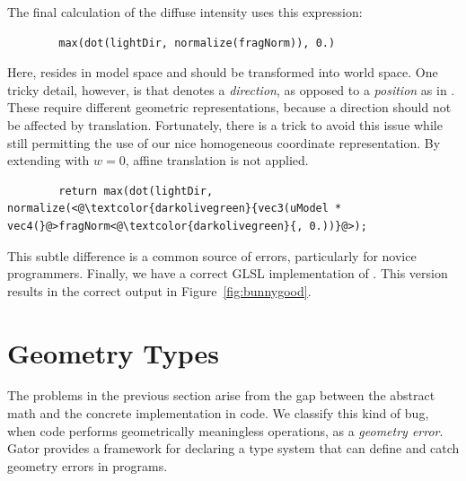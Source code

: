 \documentclass[../main.tex]{subfiles}
\begin{document}
	The final calculation of the diffuse intensity uses this expression:
	\begin{lstlisting}
		max(dot(lightDir, normalize(fragNorm)), 0.)
	\end{lstlisting}
	Here,  resides in model space and should be transformed into world space. One tricky detail, however, is that  denotes a \emph{direction}, as opposed to a \emph{position} as in . 
	These require different geometric representations, because a direction should not be affected by translation. 
	Fortunately, there is a trick to avoid this issue while still permitting the use of our nice homogeneous coordinate representation.
	By extending  with $w = 0$, affine translation is not applied. 
	\begin{lstlisting}
		return max(dot(lightDir, normalize(<@\textcolor{darkolivegreen}{vec3(uModel * vec4(}@>fragNorm<@\textcolor{darkolivegreen}{, 0.))}@>);
	\end{lstlisting}
	This subtle difference is a common source of errors, particularly for novice programmers. 
	Finally, we have a correct GLSL implementation of . This version results in the correct output in Figure~\ref{fig:bunnygood}. 
	
	\section{Geometry Types}
	\label{sec:langlang}
	
	The problems in the previous section arise from the gap between the abstract math and the concrete implementation in code.
	We classify this kind of bug, when code performs geometrically meaningless operations, as a \emph{geometry error}.
	Gator provides a framework for declaring a type system that can define and catch geometry errors in programs.
	
\end{document}
